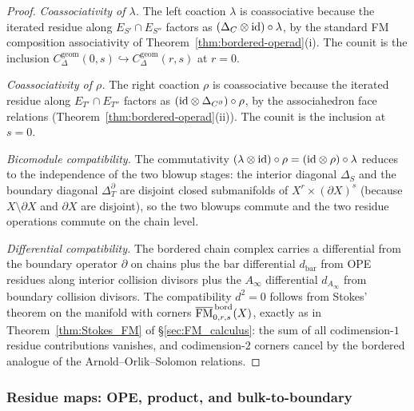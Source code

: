 \begin{proof}
\emph{Coassociativity of $\lambda$.}
The left coaction $\lambda$ is coassociative because the
iterated residue along $E_{S'}\cap E_{S''}$ factors as
$(\Delta_C\otimes\mathrm{id})\circ\lambda$, by the standard FM
composition associativity of
Theorem~\ref{thm:bordered-operad}(i). The counit is the
inclusion $C_\Delta^{\mathrm{geom}}(0,s)\hookrightarrow
C_\Delta^{\mathrm{geom}}(r,s)$ at $r=0$.

\emph{Coassociativity of $\rho$.}
The right coaction $\rho$ is coassociative because the iterated
residue along $E_{T'}\cap E_{T''}$ factors as
$(\mathrm{id}\otimes\Delta_{C^\partial})\circ\rho$, by the associahedron
face relations (Theorem~\ref{thm:bordered-operad}(ii)).
The counit is the inclusion at $s=0$.

\emph{Bicomodule compatibility.}
The commutativity $(\lambda\otimes\mathrm{id})\circ\rho
=(\mathrm{id}\otimes\rho)\circ\lambda$ reduces to the independence of
the two blowup stages: the interior diagonal $\Delta_S$ and the
boundary diagonal $\Delta_T^\partial$ are disjoint closed
submanifolds of $X^r\times(\partial X)^s$ (because
$X\setminus\partial X$ and $\partial X$ are disjoint), so
the two blowups commute and the two residue operations commute
on the chain level.

\emph{Differential compatibility.}
The bordered chain complex carries a differential from the
boundary operator $\partial$ on chains plus the bar differential
$d_{\mathrm{bar}}$ from OPE residues along interior collision
divisors plus the $A_\infty$ differential $d_{A_\infty}$ from
boundary collision divisors. The compatibility
$d^2=0$ follows from Stokes' theorem on the manifold with corners
$\overline{\mathrm{FM}}^{\,\mathrm{bord}}_{0,r,s}(X)$, exactly as in
Theorem~\ref{thm:Stokes_FM} of \S\ref{sec:FM_calculus}: the
sum of all codimension-$1$ residue contributions vanishes,
and codimension-$2$ corners cancel by the bordered analogue
of the Arnold--Orlik--Solomon relations.
\end{proof}

\subsubsection{Residue maps: OPE, product, and bulk-to-boundary}

